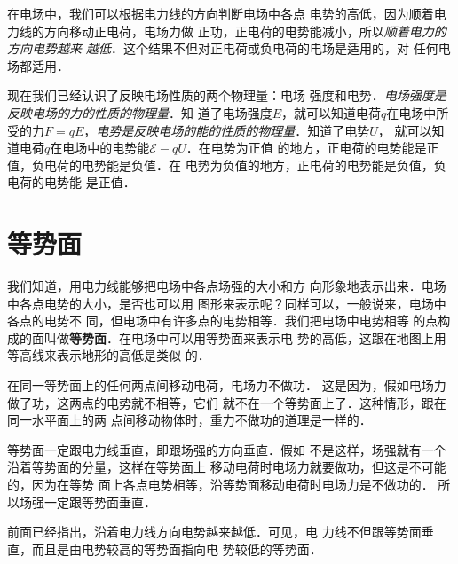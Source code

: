 在电场中，我们可以根据电力线的方向判断电场中各点
电势的高低，因为顺着电力线的方向移动正电荷，电场力做
正功，正电荷的电势能减小，所以\textit{顺着电力的方向电势越来
越低}．这个结果不但对正电荷或负电荷的电场是适用的，对
任何电场都适用．

现在我们已经认识了反映电场性质的两个物理量：电场
强度和电势．\textit{电场强度是反映电场的力的性质的物理量}．知
道了电场强度$E$，就可以知道电荷$q$在电场中所受的力$F=
qE$，\textit{电势是反映电场的能的性质的物理量}．知道了电势$U$，
就可以知道电荷$q$在电场中的电势能$\mathcal{E}-qU$．在电势为正值
的地方，正电荷的电势能是正值，负电荷的电势能是负值．在
电势为负值的地方，正电荷的电势能是负值，负电荷的电势能
是正值．

\section{等势面}

我们知道，用电力线能够把电场中各点场强的大小和方
向形象地表示出来．电场中各点电势的大小，是否也可以用
图形来表示呢？同样可以，一般说来，电场中各点的电势不
同，但电场中有许多点的电势相等．我们把电场中电势相等
的点构成的面叫做\textbf{等势面}．在电场中可以用等势面来表示电
势的高低，这跟在地图上用等高线来表示地形的高低是类似
的．

在同一等势面上的任何两点间移动电荷，电场力不做功．
这是因为，假如电场力做了功，这两点的电势就不相等，它们
就不在一个等势面上了．这种情形，跟在同一水平面上的两
点间移动物体时，重力不做功的道理是一样的．

等势面一定跟电力线垂直，即跟场强的方向垂直．假如
不是这样，场强就有一个沿着等势面的分量，这样在等势面上
移动电荷时电场力就要做功，但这是不可能的，因为在等势
面上各点电势相等，沿等势面移动电荷时电场力是不做功的．
所以场强一定跟等势面垂直．

前面已经指出，沿着电力线方向电势越来越低．可见，电
力线不但跟等势面垂直，而且是由电势较高的等势面指向电
势较低的等势面．

